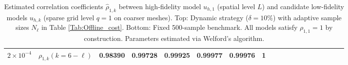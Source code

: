 \begin{table}[ht]
{\begin{tabular}{|c|c|c|c|c|c|c|c|c|c|c|c|c|c|c|c|c|c|c|}
\multirow{1}{*}{$2\times 10^{-4}$}&\multicolumn{1}{|c|}{$\rho_{1,k} (k=6-\ell)$}&0.98390   &0.99728   &0.99925   &0.99977   &0.99976   &1\\
\hline
\end{tabular}}
\caption{Estimated correlation coefficients $\widehat \rho_{1,k}$ between high-fidelity model $ u_{h,1}$ (spatial level $L$) and candidate low-fidelity models $ u_{h,k}$ (sparse grid level $q=1$ on coarser meshes). Top: Dynamic strategy ($\delta=10\%$) with adaptive sample sizes $N_\ell$ in Table \ref{Tab:Offline_cost}. Bottom: Fixed 500-sample benchmark. All models satisfy $\rho_{1,1}=1$ by construction. Parameters estimated via Welford's algorithm.}
\label{Tab:MFMC_parameters}
\end{table}
%




